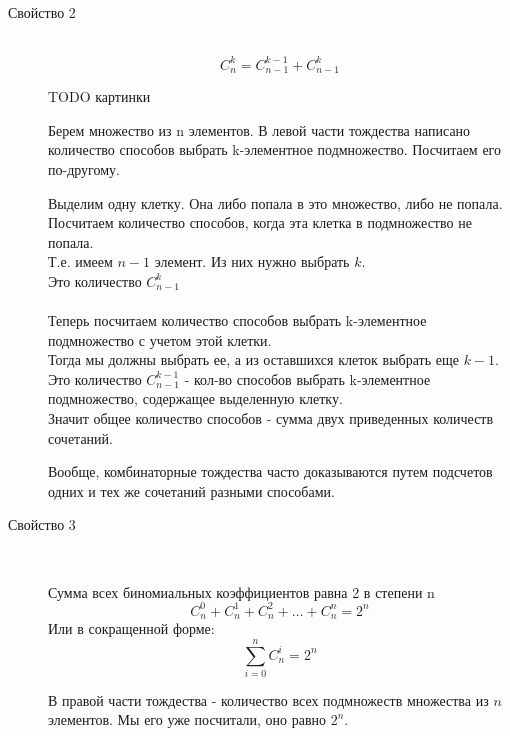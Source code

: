 \begin{description}
\item[Свойство 2]~	
$$
C_n^k = C_{n-1}^{k-1} + C_{n-1}^k
$$


TODO картинки

Берем множество из n элементов. В левой части тождества написано количество способов выбрать k-элементное подмножество. Посчитаем его по-другому.

Выделим одну клетку. Она либо попала в это множество, либо не попала. \\
Посчитаем количество способов, когда эта клетка в подмножество не попала. \\
Т.е. имеем $ n-1 $ элемент. Из них нужно выбрать $ k $. \\
Это количество $C_{n-1}^k$ \\
\\
Теперь посчитаем количество способов выбрать k-элементное подмножество с учетом этой клетки. \\
Тогда мы должны выбрать ее, а из оставшихся клеток выбрать еще $ k-1 $.
Это количество $C_{n-1}^{k-1}$ - кол-во способов выбрать k-элементное подмножество, содержащее выделенную клетку. \\
Значит общее количество способов - сумма двух приведенных количеств сочетаний.

Вообще, комбинаторные тождества часто доказываются путем подсчетов одних и тех же сочетаний разными способами.

\end{description}


\begin{description}
\item[Свойство 3]~	

Сумма всех биномиальных коэффициентов равна 2 в степени n
$$
C_n^0 + C_n^1 + C_n^2 + \ldots + C_n^n = 2^n  
$$
Или в сокращенной форме: 
$$
\sum\limits_{i = 0}^{n} C_n^i = 2^n
$$

В правой части тождества - количество всех подмножеств множества из $ n $ элементов.
Мы его уже посчитали, оно равно $2^n$.

 \end{description}



